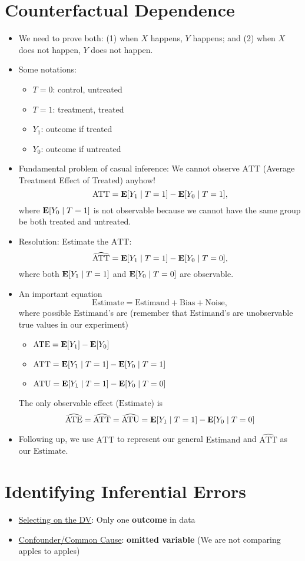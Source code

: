 \documentclass[10pt, letterpaper]{article}
\def\E{\vb{E}}
\def\ATT{\mathrm{ATT}}
\def\ATE{\mathrm{ATE}}
\def\ATU{\mathrm{ATU}}
\begin{document}
\section{Counterfactual Dependence}
\begin{itemize}
	\item We need to prove both: (1) when $X$ happens, $Y$ happens; and (2) when $X$ does not happen, $Y$ does not happen. 
	\item Some notations:
	\begin{itemize}
		\item $T=0$: control, untreated
		\item $T=1$: treatment, treated
		\item $Y_1$: outcome if treated
		\item $Y_0$: outcome if untreated
	\end{itemize}
	\item Fundamental problem of casual inference: We cannot observe $\ATT$ (Average Treatment Effect of Treated) anyhow!  \[\ATT=\E\qty[Y_1\mid T=1]-\E\qty[Y_0\mid T=1],\] where $\E\qty[Y_0\mid T=1]$ is not observable because we cannot have the same group be both treated and untreated.  
	\item Resolution: Estimate the $\ATT$: \[\widehat{\ATT}=\E\qty[Y_1\mid T=1]-\E\qty[Y_0\mid T=0],\] where both $\E\qty[Y_1\mid T=1]$ and $\E\qty[Y_0\mid T=0]$ are observable.
	\item An important equation \[\boxed{\textrm{Estimate}}=\boxed{\textrm{Estimand}}+\textrm{Bias}+\textrm{Noise},\] where possible $\mathrm{Estimand}$'s are (remember that $\mathrm{Estimand}$'s are unobservable true values in our experiment)
	\begin{itemize}
		\item $\ATE=\E[Y_1]-\E[Y_0]$
		\item $\ATT=\E\qty[Y_1\mid T=1]-\E\qty[Y_0\mid T=1]$
		\item $\ATU=\E\qty[Y_1\mid T=1]-\E\qty[Y_0\mid T=0]$
	\end{itemize}
	The only observable effect ($\mathrm{Estimate}$) is \[\widehat{\ATE}=\widehat{\ATT}=\widehat{\ATU}=\E\qty[Y_1\mid T=1]-\E\qty[Y_0\mid T=0]\]
	\item Following up, we use $\ATT$ to represent our general $\mathrm{Estimand}$ and $\widehat{\ATT}$ as our $\mathrm{Estimate}$.
\end{itemize}

\section{Identifying Inferential Errors}
\begin{itemize}
	\item \underline{Selecting on the DV}: Only one \textbf{outcome} in data
	\item \underline{Confounder/Common Cause}: \textbf{omitted variable} (We are not comparing apples to apples)
\end{itemize}
\end{document}
